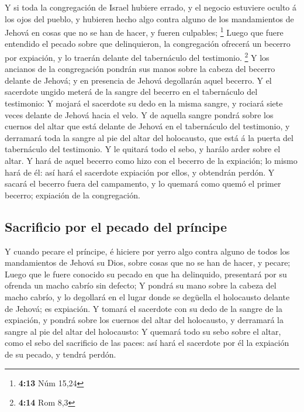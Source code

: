  Y si toda la congregación de Israel hubiere errado, y el
negocio estuviere oculto á los ojos del pueblo, y hubieren hecho algo
contra alguno de los mandamientos de Jehová en cosas que no se han de
hacer, y fueren culpables; \footnote{\textbf{4:13} Núm 15,24}
 Luego que fuere entendido el pecado sobre que
delinquieron, la congregación ofrecerá un becerro por expiación, y lo
traerán delante del tabernáculo del testimonio. \footnote{\textbf{4:14}
  Rom 8,3}  Y los ancianos de la congregación pondrán sus
manos sobre la cabeza del becerro delante de Jehová; y en presencia de
Jehová degollarán aquel becerro.  Y el sacerdote ungido
meterá de la sangre del becerro en el tabernáculo del testimonio:
 Y mojará el sacerdote su dedo en la misma sangre, y
rociará siete veces delante de Jehová hacia el velo.  Y
de aquella sangre pondrá sobre los cuernos del altar que está delante de
Jehová en el tabernáculo del testimonio, y derramará toda la sangre al
pie del altar del holocausto, que está á la puerta del tabernáculo del
testimonio.  Y le quitará todo el sebo, y harálo arder
sobre el altar.  Y hará de aquel becerro como hizo con el
becerro de la expiación; lo mismo hará de él: así hará el sacerdote
expiación por ellos, y obtendrán perdón.  Y sacará el
becerro fuera del campamento, y lo quemará como quemó el primer becerro;
expiación de la congregación.

\hypertarget{sacrificio-por-el-pecado-del-pruxedncipe}{%
\subsection{Sacrificio por el pecado del
príncipe}\label{sacrificio-por-el-pecado-del-pruxedncipe}}

 Y cuando pecare el príncipe, é hiciere por yerro algo
contra alguno de todos los mandamientos de Jehová su Dios, sobre cosas
que no se han de hacer, y pecare;  Luego que le fuere
conocido su pecado en que ha delinquido, presentará por su ofrenda un
macho cabrío sin defecto;  Y pondrá su mano sobre la
cabeza del macho cabrío, y lo degollará en el lugar donde se degüella el
holocausto delante de Jehová; es expiación.  Y tomará el
sacerdote con su dedo de la sangre de la expiación, y pondrá sobre los
cuernos del altar del holocausto, y derramará la sangre al pie del altar
del holocausto:  Y quemará todo su sebo sobre el altar,
como el sebo del sacrificio de las paces: así hará el sacerdote por él
la expiación de su pecado, y tendrá perdón.

